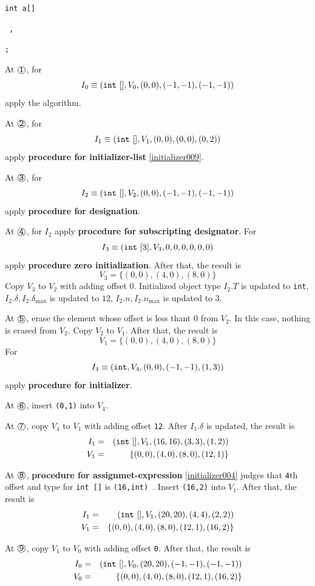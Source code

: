 \begin{Example}
{\tt int a[] 
}

{\tt
{}
,
}

{\tt {};}

\noindent
At $\MARU{\tt 1}$, for
\[
I_0 \equiv ({\tt{int\,\,[]}}, V_0, (0,0),(-1,-1),(-1,-1))
\]
apply the algorithm.

\noindent
At $\MARU{\tt 2}$, for
\[
I_1 \equiv ({\tt{int\,\,[]}},V_1,(0,0),(0,0),(0,2)) 
\]
apply {\bf procedure for initializer-list} \ref{initializer009}.

\noindent
At $\MARU{\tt 3}$, for
\[
I_2 \equiv ({\tt int\,\,[]}, V_2, (0,0), (-1,-1),(-1,-1))
\]
apply
{\bf procedure for designation}.

\noindent
At $\MARU{\tt 4}$, for $I_2$ apply
{\bf procedure for subscripting designator}.
For
\[
 I_3 \equiv ({\tt{int\,\,[3]}}, V_3,0,0,0,0,0,0)
\]
apply {\bf procedure zero initialization}.
After that, the result is
\[
 V_3 = \{ (0,0), (4,0), (8,0) \}
\]
Copy $V_3$ to $V_2$ with adding offset $0$.
Initialized object type $I_2.T$ is updated to {\tt{int}}, 
$I_2.{\delta}, I_2.{\delta}_{\max}$ is updated to $12$,
$I_2.n, I_2.n_{\max}$ is updated to $3$.

\noindent
At $\MARU{\tt 5}$, erase the element whose offset is less thant $0$ from
$V_2$. In this case, nothing is erased from $V_2$.
Copy $V_2$ to $V_1$. After that, the result is
\[
V_1 = \{ (0,0), (4,0), (8,0) \}
\]
For
\[
I_4 \equiv ({\tt{int}}, V_4, (0,0), (-1,-1), (1,3))
\]
apply {\bf procedure for initializer}.

\noindent
At $\MARU{\tt 6}$, insert {\tt (0,1)} into $V_4$.

\noindent
At $\MARU{\tt 7}$,
copy $V_4$ to $V_1$ with adding offset {\tt{12}}.
After $I_1.\delta$ is updated, the result is
\begin{eqnarray*}
I_1 & = & ({\tt{int\,\,[]}},V_1,(16,16),(3,3),(1,2))  \\
V_1 & = & \{ (0,0), (4,0), (8,0), (12,1) \}
\end{eqnarray*}

\noindent
At $\MARU{\tt 8}$, {\bf procedure for assignmet-expression}
\ref{initializer004} judges that
{\tt{4}}th offset and type for {\tt int []} is
{\tt (16,int) }. Insert {\tt (16,2)} into $V_1$.
After that, the result is
\begin{eqnarray*}
I_1 & = & ({\tt{int\,\,[]}},V_1,(20,20),(4,4),(2,2))  \\
V_1 & = & \{ (0,0), (4,0), (8,0), (12,1), (16,2) \}
\end{eqnarray*}

\noindent
At $\MARU{\tt 9}$,
copy $V_1$ to $V_0$ with adding offset {\tt 0}.
After that, the result is
\begin{eqnarray*}
I_0 & = & ({\tt{int\,\,[]}},V_0,(20,20),(-1,-1),(-1,-1))  \\
V_0 & = & \{ (0,0), (4,0), (8,0), (12,1), (16,2) \}
\end{eqnarray*}

\end{Example}

